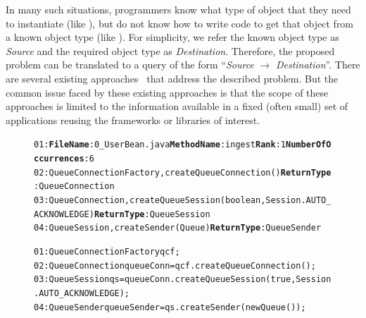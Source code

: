 \documentclass{fp035-thummalapenta}
\begin{document}
In many such situations, programmers know what type of object that
they need to instantiate (like ), but do
not know how to write code to get that object from a known object
type (like ). For simplicity, we refer the known
object type as \emph{Source} and the required object type as
\emph{Destination}. Therefore, the proposed problem can be
translated to a query of the form ``\emph{Source} $\rightarrow$
\emph{Destination}''. There are several existing
approaches~\cite{prospector:jungloid, strathcona:se, xsnippet:saha}
that address the described problem. But the common issue faced by
these existing approaches is that the scope of these approaches is
limited to the information available in a fixed (often small) set of
applications reusing the frameworks or libraries of interest.
\begin{figure}[t]
\begin{CodeOut}
\begin{alltt}
\hspace*{0.6in}01:\textbf{FileName}:0\_UserBean.java \textbf{MethodName}:ingest  \textbf{Rank}:1 \textbf{NumberOfOccurrences}:6
\hspace*{0.6in}02:QueueConnectionFactory,createQueueConnection() \textbf{ReturnType}:QueueConnection
\hspace*{0.6in}03:QueueConnection,createQueueSession(boolean,Session.AUTO\_ACKNOWLEDGE) \textbf{ReturnType}:QueueSession
\hspace*{0.6in}04:QueueSession,createSender(Queue) \textbf{ReturnType}:QueueSender
\end{alltt}
\end{CodeOut}
\vspace*{-4ex} 
\begin{CodeOut}
\begin{alltt}
\hspace*{0.6in}01:QueueConnectionFactory qcf;
\hspace*{0.6in}02:QueueConnection queueConn = qcf.createQueueConnection();
\hspace*{0.6in}03:QueueSession qs = queueConn.createQueueSession(true,Session.AUTO\_ACKNOWLEDGE);
\hspace*{0.6in}04:QueueSender queueSender = qs.createSender(new Queue());
\end{alltt}
\end{CodeOut}\vspace*{-4ex}
 \vspace*{-3ex}
\end{figure}
\end{document}
